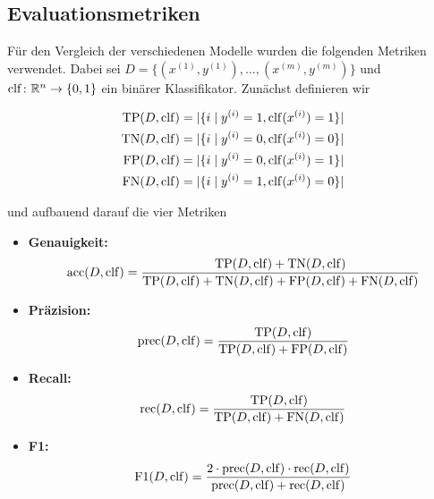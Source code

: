 \subsection{Evaluationsmetriken}
Für den Vergleich der verschiedenen Modelle wurden die folgenden Metriken verwendet. Dabei sei $D = \{(x^{(1)}, y^{(1)}), \dots, (x^{(m)}, y^{(m)})\}$ und $\clf\colon\mathbb{R}^n \to \{0, 1\}$ ein binärer Klassifikator. Zunächst definieren wir

\begin{align*}
    \tp(D, \clf) &= |\{i \mid y^{(i)} = 1, \clf(x^{(i)}) = 1\}| \\
    \tn(D, \clf) &= |\{i \mid y^{(i)} = 0, \clf(x^{(i)}) = 0\}| \\
    \fp(D, \clf) &= |\{i \mid y^{(i)} = 0, \clf(x^{(i)}) = 1\}| \\
    \fn(D, \clf) &= |\{i \mid y^{(i)} = 1, \clf(x^{(i)}) = 0\}|
\end{align*}

und aufbauend darauf die vier Metriken

\begin{itemize}
    \item \textbf{Genauigkeit:}
        \begin{equation*}
            \acc(D, \clf) = \frac{\tp(D, \clf) + \tn(D, \clf)}{\tp(D, \clf) + \tn(D, \clf) + \fp(D, \clf) + \fn(D, \clf)}
        \end{equation*}
    \item \textbf{Präzision:}
        \begin{equation*}
            \prec(D, \clf) = \frac{\tp(D, \clf)}{\tp(D, \clf) + \fp(D, \clf)}
        \end{equation*}
    \item \textbf{Recall:}
        \begin{equation*}
            \rec(D, \clf) = \frac{\tp(D, \clf)}{\tp(D, \clf) + \fn(D, \clf)}
        \end{equation*}
    \item \textbf{F1:}
        \begin{equation*}
            \fscore(D, \clf) = \frac{2 \cdot \prec(D, \clf) \cdot \rec(D, \clf)}{\prec(D, \clf) + \rec(D, \clf)}
        \end{equation*}
\end{itemize}

